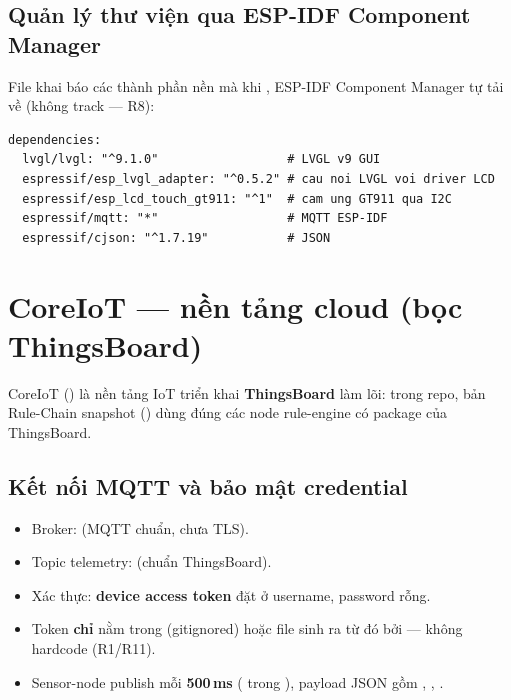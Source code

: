 \subsection{Quản lý thư viện qua ESP-IDF Component Manager}

File  khai báo các
thành phần nền mà khi , ESP-IDF Component Manager tự tải về
 (không track — R8):

\begin{verbatim}
dependencies:
  lvgl/lvgl: "^9.1.0"                  # LVGL v9 GUI
  espressif/esp_lvgl_adapter: "^0.5.2" # cau noi LVGL voi driver LCD
  espressif/esp_lcd_touch_gt911: "^1"  # cam ung GT911 qua I2C
  espressif/mqtt: "*"                  # MQTT ESP-IDF
  espressif/cjson: "^1.7.19"           # JSON
\end{verbatim}

\section{CoreIoT — nền tảng cloud (bọc ThingsBoard)}

CoreIoT () là nền tảng IoT triển khai \textbf{ThingsBoard}
làm lõi: trong repo, bản Rule-Chain snapshot
() dùng đúng các
node rule-engine có package  của
ThingsBoard.

\subsection{Kết nối MQTT và bảo mật credential}

\begin{itemize}
\item Broker:  (MQTT chuẩn, chưa TLS).
\item Topic telemetry:  (chuẩn ThingsBoard).
\item Xác thực: \textbf{device access token} đặt ở username, password rỗng.
\item Token \textbf{chỉ} nằm trong  (gitignored) hoặc
file  sinh ra từ đó bởi
 — không hardcode (R1/R11).
\item Sensor-node publish mỗi \textbf{500\,ms}
( trong
), payload
JSON gồm , , .
\end{itemize}

